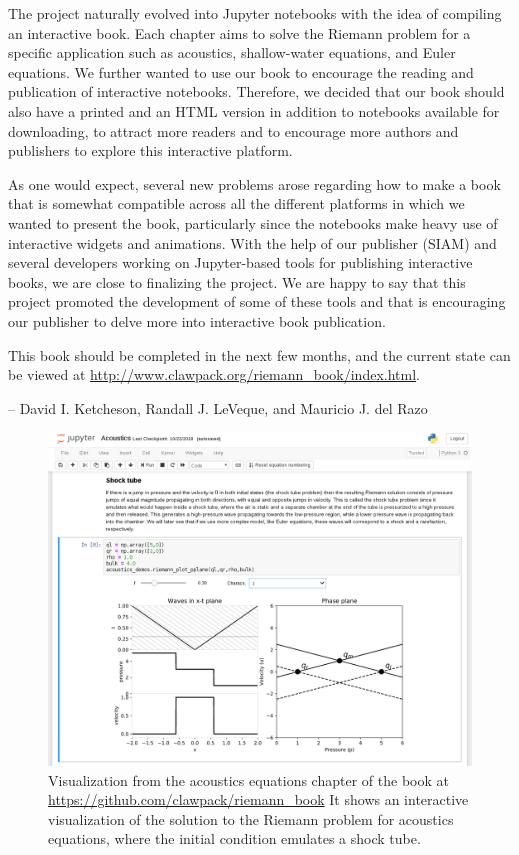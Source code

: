 \documentclass[]{book}
\begin{document}
The project naturally evolved into Jupyter notebooks with the idea of compiling an interactive book. Each chapter aims to solve the Riemann problem for a specific application such as acoustics, shallow-water equations, and Euler equations. We further wanted to use our book to encourage the reading and publication of interactive notebooks. Therefore, we decided that our book should also have a printed and an HTML version in addition to notebooks available for downloading, to attract more readers and to encourage more authors and publishers to explore this interactive platform.

As one would expect, several new problems arose regarding how to make a book that is somewhat compatible across all the different platforms in which we wanted to present the book, particularly since the notebooks make heavy use of interactive widgets and animations. With the help of our publisher (SIAM) and several developers working on Jupyter-based tools for publishing interactive books, we are close to finalizing the project. We are happy to say that this project promoted the development of some of these tools and that is encouraging our publisher to delve more into interactive book publication.

This book should be completed in the next few months, and the current state can be viewed at \url{http://www.clawpack.org/riemann_book/index.html}.

-- David I. Ketcheson, Randall J. LeVeque, and Mauricio J. del Razo

\begin{figure}
\centering
\includegraphics{images/shocktube.png}
\caption{Visualization from the acoustics equations chapter of the book at
\url{https://github.com/clawpack/riemann_book}
It shows an interactive visualization of the solution to the Riemann problem for acoustics equations, where the initial condition emulates a shock tube.}
\end{figure}
\end{document}
